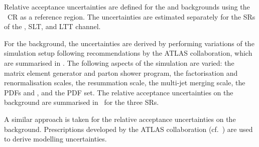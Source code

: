 


Relative acceptance uncertainties are defined for the \ZHF and \ttbar
backgrounds using the \ZHF~CR as a reference region. The uncertainties are
estimated separately for the SRs of the \hadhad, \lephad SLT, and \lephad LTT
channel.

For the \ZHF background, the uncertainties are derived by performing variations
of the simulation setup following recommendations by the ATLAS collaboration,
which are summarised in . The following aspects of
the simulation are varied: the matrix element generator and parton shower
program, the factorisation and renormalisation scales, the resummation scale,
the multi-jet merging scale, the PDFs and \alphas, and the PDF set. The relative
acceptance uncertainties on the \ZHF background are summarised
in~ for the three SRs.



A similar approach is taken for the relative acceptance uncertainties on the
\ttbar background. Prescriptions developed by the ATLAS collaboration
(cf.~) are used to derive \ttbar modelling
uncertainties.

